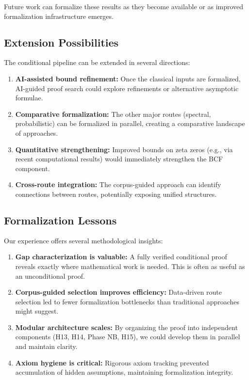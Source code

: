 \documentclass[11pt,a4paper]{article}
\begin{document}
Future work can formalize these results as they become available or as improved formalization infrastructure emerges.

\subsection{Extension Possibilities}

The conditional pipeline can be extended in several directions:

\begin{enumerate}
  \item \textbf{AI-assisted bound refinement:} Once the classical inputs are formalized, AI-guided proof search could explore refinements or alternative asymptotic formulae.

  \item \textbf{Comparative formalization:} The other major routes (spectral, probabilistic) can be formalized in parallel, creating a comparative landscape of approaches.

  \item \textbf{Quantitative strengthening:} Improved bounds on zeta zeros (e.g., via recent computational results) would immediately strengthen the BCF component.

  \item \textbf{Cross-route integration:} The corpus-guided approach can identify connections between routes, potentially exposing unified structures.
\end{enumerate}

\subsection{Formalization Lessons}

Our experience offers several methodological insights:

\begin{enumerate}
  \item \textbf{Gap characterization is valuable:} A fully verified conditional proof reveals exactly where mathematical work is needed. This is often as useful as an unconditional proof.

  \item \textbf{Corpus-guided selection improves efficiency:} Data-driven route selection led to fewer formalization bottlenecks than traditional approaches might suggest.

  \item \textbf{Modular architecture scales:} By organizing the proof into independent components (H13, H14, Phase NB, H15), we could develop them in parallel and maintain clarity.

  \item \textbf{Axiom hygiene is critical:} Rigorous axiom tracking prevented accumulation of hidden assumptions, maintaining formalization integrity.
\end{enumerate}
\end{document}
